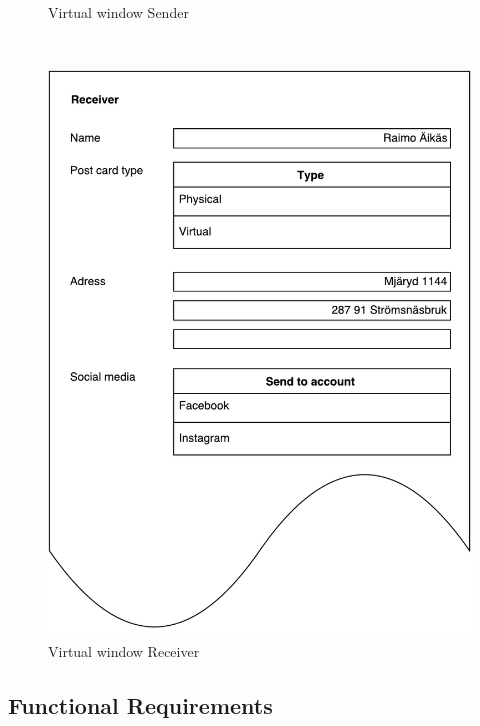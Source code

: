 \documentclass[10pt,a4paper]{article}
\begin{document}
\begin{centering}
\begin{figure}[!ht]
\begin{minipage}{0.3\textwidth}
\caption{Virtual window Sender}
\label{fig:virtualwindows_sender}
\end{minipage}\hfill
~
\begin{minipage}{0.3\textwidth}
\includegraphics[width=\linewidth]{Data_figures/virtualwindows_receiver.pdf}
\caption{Virtual window Receiver}
\label{fig:virtualwindows_receiver}
\end{minipage}

\end{figure}
\end{centering}

\subsection{Functional Requirements}
\end{document}
